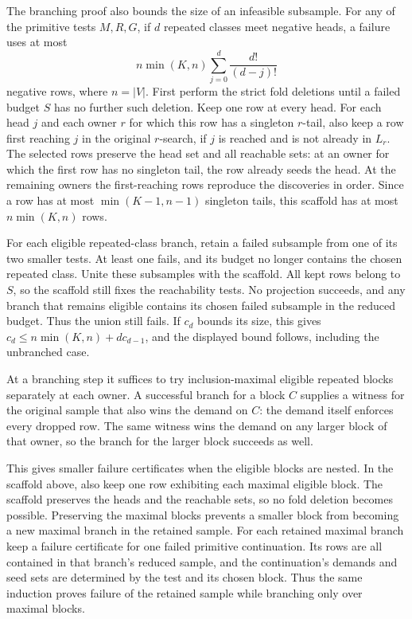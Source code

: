 The branching proof also bounds the size of
an infeasible subsample. For any of the
primitive tests $M,R,G$, if $d$ repeated
classes meet negative heads, a failure
uses at most
\[
 n\min(K,n)\sum_{j=0}^{d}\frac{d!}{(d-j)!}
\]
negative rows, where $n=|V|$.
First perform the strict fold deletions
until a failed budget $S$ has no further
such deletion. Keep one row at every
head. For each head $j$ and each owner
$r$ for which this row has a singleton
$r$-tail, also keep a row first reaching
$j$ in the original $r$-search, if $j$
is reached and is not already in $L_r$. The selected rows preserve
the head set and all reachable sets:
at an owner for which the first row has
no singleton tail, the row already seeds
the head. At the remaining owners the
first-reaching rows reproduce the
discoveries in order. Since a row has
at most $\min(K-1,n-1)$ singleton tails,
this scaffold has at most $n\min(K,n)$
rows.

For each eligible repeated-class branch,
retain a failed subsample from one of
its two smaller tests. At least one
fails, and its budget no longer contains
the chosen repeated class. Unite these
subsamples with the scaffold. All kept
rows belong to $S$, so the scaffold
still fixes the reachability tests.
No projection succeeds, and any branch
that remains eligible contains its
chosen failed subsample in the reduced
budget. Thus the union still fails.
If $c_d$ bounds its size, this gives
$c_d\leq n\min(K,n)+d c_{d-1}$, and the
displayed bound follows, including the
unbranched case.

At a branching step it suffices to try inclusion-maximal
eligible repeated blocks separately at each owner. A
successful branch for a block $C$ supplies a witness
for the original sample that also wins the demand on
$C$: the demand itself enforces every dropped row.
The same witness wins the demand on any larger block
of that owner, so the branch for the larger block
succeeds as well.

This gives smaller failure certificates when the
eligible blocks are nested. In the scaffold above,
also keep one row exhibiting each maximal eligible
block. The scaffold preserves the heads and the
reachable sets, so no fold deletion becomes possible.
Preserving the maximal blocks prevents a smaller
block from becoming a new maximal branch in the
retained sample. For each retained maximal branch
keep a failure certificate for one failed primitive
continuation. Its rows are all contained in that
branch's reduced sample, and the continuation's
demands and seed sets are determined by the test
and its chosen block. Thus the same induction proves
failure of the retained sample while branching only
over maximal blocks.

